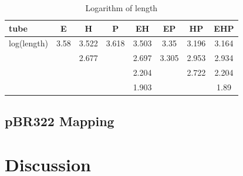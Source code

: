 \documentclass{article}
\begin{document}
            \begin{table}[H]
                \caption{Logarithm of length}
                \begin{center}\begin{tabular}{|l|c|c|c|c|c|c|c|}
                    \hline
                    tube&E&H&P&EH&EP&HP&EHP\\
                    \hline
                    log(length)&3.58&3.522&3.618&3.503&3.35&3.196&3.164\\
                    &&2.677&&2.697&3.305&2.953&2.934\\
                    &&&&2.204&&2.722&2.204\\
                    &&&&1.903&&&1.89\\
                    \hline
                \end{tabular}\end{center}
                \label{data.log.table}
            \end{table}
        \subsection{pBR322 Mapping}

    
    \section{Discussion}
\end{document}
